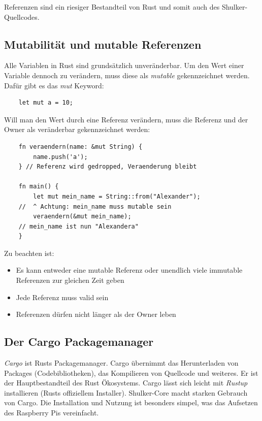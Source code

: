 Referenzen sind ein riesiger Bestandteil von Rust und somit auch des Shulker-Quellcodes.

\subsection{Mutabilität und mutable Referenzen}
Alle Variablen in Rust sind grundsätzlich unveränderbar. Um den Wert einer Variable dennoch zu verändern,
muss diese als \textit{mutable} gekennzeichnet werden. Dafür gibt es das \textit{mut} Keyword:
\begin{lstlisting}
    let mut a = 10;
\end{lstlisting}
Will man den Wert durch eine Referenz verändern, muss die Referenz und der Owner als veränderbar gekennzeichnet werden:
\begin{lstlisting}
    fn veraendern(name: &mut String) {
        name.push('a');
    } // Referenz wird gedropped, Veraenderung bleibt

    fn main() {
        let mut mein_name = String::from("Alexander");
    //  ^ Achtung: mein_name muss mutable sein
        veraendern(&mut mein_name);
    // mein_name ist nun "Alexandera"
    }
\end{lstlisting}
Zu beachten ist:
\begin{itemize}
    \item Es kann entweder eine mutable Referenz oder unendlich viele immutable Referenzen zur gleichen Zeit geben
    \item Jede Referenz muss valid sein
    \item Referenzen dürfen nicht länger als der Owner leben
\end{itemize}

\subsection{Der Cargo Packagemanager}
\textit{Cargo} ist Rusts Packagemanager. Cargo übernimmt das Herunterladen von Packages (Codebibliotheken), das Kompilieren von Quellcode und weiteres.
Er ist der Hauptbestandteil des Rust Ökosystems. Cargo lässt sich leicht mit \textit{Rustup} installieren (Rusts offiziellem Installer). Shulker-Core macht
starken Gebrauch von Cargo. Die Installation und Nutzung ist besonders simpel, was das Aufsetzen des Raspberry Pis vereinfacht.